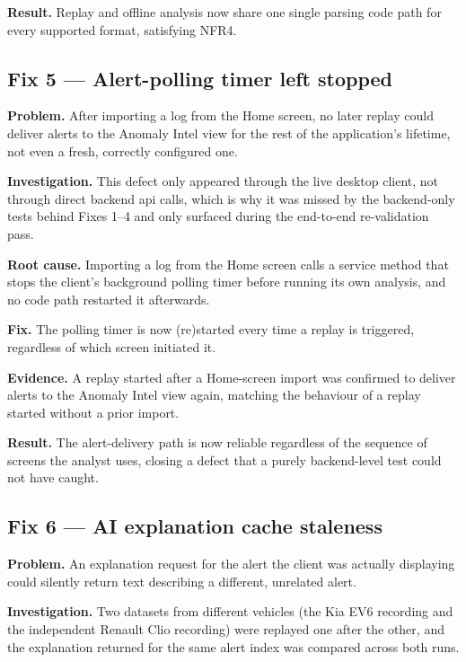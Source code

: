 \textbf{Result.} Replay and offline analysis now share one single parsing code path for every supported format, satisfying NFR4.

\subsection{Fix 5 — Alert-polling timer left stopped}

\textbf{Problem.} After importing a log from the Home screen, no later replay could deliver alerts to the Anomaly Intel view for the rest of the application's lifetime, not even a fresh, correctly configured one.

\textbf{Investigation.} This defect only appeared through the live desktop client, not through direct backend \gls{api} calls, which is why it was missed by the backend-only tests behind Fixes 1--4 and only surfaced during the end-to-end re-validation pass.

\textbf{Root cause.} Importing a log from the Home screen calls a service method that stops the client's background polling timer before running its own analysis, and no code path restarted it afterwards.

\textbf{Fix.} The polling timer is now (re)started every time a replay is triggered, regardless of which screen initiated it.

\textbf{Evidence.} A replay started after a Home-screen import was confirmed to deliver alerts to the Anomaly Intel view again, matching the behaviour of a replay started without a prior import.

\textbf{Result.} The alert-delivery path is now reliable regardless of the sequence of screens the analyst uses, closing a defect that a purely backend-level test could not have caught.

\subsection{Fix 6 — AI explanation cache staleness}
\label{sec:validation-ai}

\textbf{Problem.} An explanation request for the alert the client was actually displaying could silently return text describing a different, unrelated alert.

\textbf{Investigation.} Two datasets from different vehicles (the Kia EV6 recording and the independent Renault Clio recording) were replayed one after the other, and the explanation returned for the same alert index was compared across both runs.

